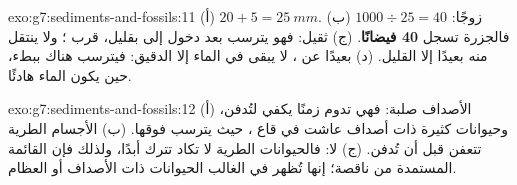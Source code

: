 \begin{solution}{exo:g7:sediments-and-fossils:11}
(أ) $20 + 5 = \qty{25}{mm}$. (ب) $1000 \div 25 = 40$ زوجًا: فالجزرة
تسجل \textbf{40 فيضانًا}. (ج)  ثقيل: فهو يترسب بعد دخول  إلى
 بقليل، قرب ؛ ولا ينتقل منه بعيدًا إلا القليل. (د) بعيدًا عن
، لا يبقى في الماء إلا  الدقيق: فيترسب هناك ببطء، حين يكون
الماء هادئًا.
\end{solution}

\begin{solution}{exo:g7:sediments-and-fossils:12}
(أ) الأصداف صلبة: فهي تدوم زمنًا يكفي لتُدفن، وحيوانات كثيرة ذات أصداف
عاشت في قاع ، حيث يترسب  فوقها. (ب) الأجسام الطرية تتعفن قبل أن
تُدفن. (ج) لا: فالحيوانات الطرية لا تكاد تترك  أبدًا، ولذلك فإن
القائمة المستمدة من  ناقصة؛ إنها تُظهر في الغالب الحيوانات ذات
الأصداف أو العظام.
\end{solution}

